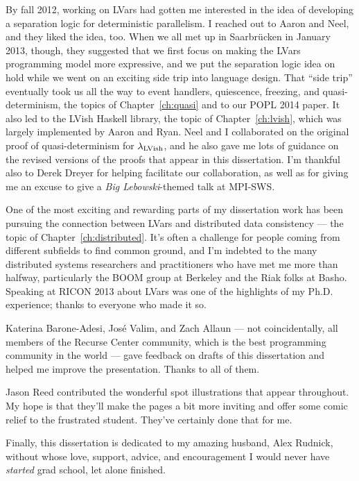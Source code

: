 By fall 2012, working on LVars had gotten me interested in the idea of
developing a separation logic for deterministic parallelism.  I
reached out to Aaron and Neel, and they liked the idea, too.  When we
all met up in Saarbr{\"u}cken in January 2013, though, they suggested
that we first focus on making the LVars programming model more
expressive, and we put the separation logic idea on hold while we went
on an exciting side trip into language design.  That ``side trip''
eventually took us all the way to event handlers, quiescence,
freezing, and quasi-determinism, the topics of Chapter~\ref{ch:quasi}
and to our POPL 2014 paper.  It also led to the LVish Haskell library,
the topic of Chapter~\ref{ch:lvish}, which was largely implemented by
Aaron and Ryan.  Neel and I collaborated on the original proof of
quasi-determinism for $\lambda_{\textrm{LVish}}$, and he also gave me lots of
guidance on the revised versions of the proofs that appear in this
dissertation.  I'm thankful also to Derek Dreyer for helping
facilitate our collaboration, as well as for giving me an excuse to
give a \emph{Big Lebowski}-themed talk at MPI-SWS.

One of the most exciting and rewarding parts of my dissertation work
has been pursuing the connection between LVars and distributed data
consistency --- the topic of Chapter~\ref{ch:distributed}.  It's often
a challenge for people coming from different subfields to find common
ground, and I'm indebted to the many distributed systems researchers
and practitioners who have met me more than halfway, particularly the
BOOM group at Berkeley and the Riak folks at Basho.  Speaking at RICON
2013 about LVars was one of the highlights of my Ph.D. experience;
thanks to everyone who made it so.

Katerina Barone-Adesi, Jos\'{e} Valim, and Zach Allaun --- not
coincidentally, all members of the Recurse Center community, which is
the best programming community in the world --- gave feedback on
drafts of this dissertation and helped me improve the presentation.
Thanks to all of them.

Jason Reed contributed the wonderful spot illustrations that appear
throughout.  My hope is that they'll make the pages a bit more
inviting and offer some comic relief to the frustrated student.
They've certainly done that for me.

Finally, this dissertation is dedicated to my amazing husband, Alex
Rudnick, without whose love, support, advice, and encouragement I
would never have \emph{started} grad school, let alone finished.
